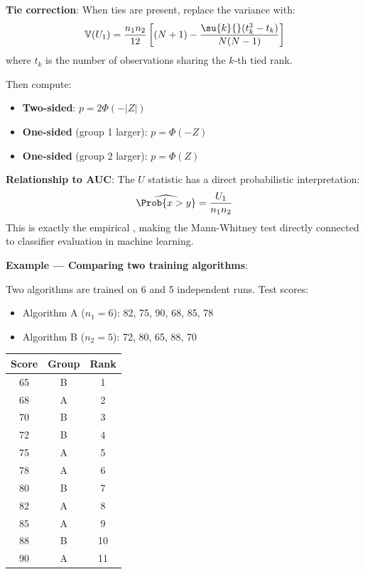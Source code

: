 \textbf{Tie correction}: When ties are present, replace the variance with:
$$\mathbb{V}(U_1) = \dfrac{n_1 n_2}{12}\left[(N+1) - \dfrac{\su{k}{}(t_k^3 - t_k)}{N(N-1)}\right]$$
where $t_k$ is the number of observations sharing the $k$-th tied rank.

Then compute:
\begin{itemize}
    \item \textbf{Two-sided}: $p = 2\Phi(-|Z|)$
    \item \textbf{One-sided} (group 1 larger): $p = \Phi(-Z)$
    \item \textbf{One-sided} (group 2 larger): $p = \Phi(Z)$
\end{itemize}

\textbf{Relationship to AUC}: The $U$ statistic has a direct probabilistic interpretation:
$$\widehat{\Prob{x > y}} = \dfrac{U_1}{n_1 n_2}$$
This is exactly the empirical , making the Mann-Whitney
test directly connected to classifier evaluation in machine learning.

\textbf{Example — Comparing two training algorithms}:

Two algorithms are trained on 6 and 5 independent runs. Test scores:
\begin{itemize}
    \item Algorithm A ($n_1 = 6$): 82, 75, 90, 68, 85, 78
    \item Algorithm B ($n_2 = 5$): 72, 80, 65, 88, 70
\end{itemize}

\begin{center}
\begin{tabular}{|c|c|c|}
    \hline
    \textbf{Score} & \textbf{Group} & \textbf{Rank} \\
    \hline
    65 & B & 1 \\
    68 & A & 2 \\
    70 & B & 3 \\
    72 & B & 4 \\
    75 & A & 5 \\
    78 & A & 6 \\
    80 & B & 7 \\
    82 & A & 8 \\
    85 & A & 9 \\
    88 & B & 10 \\
    90 & A & 11 \\
    \hline
\end{tabular}
\end{center}

